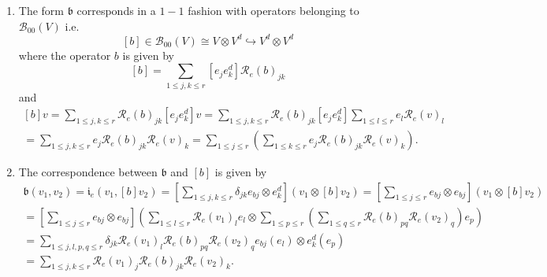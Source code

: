 \documentclass[aps,preprint]{revtex4}%
\begin{document}
\begin{enumerate}
\begin{enumerate}
\item The form $\mathfrak{b}$ corresponds in a $1-1$ fashion with operators
belonging to $\mathcal{B}_{00}\left(  V\right)  $ i.e.
\begin{equation}
\left[  b\right]  \in\mathcal{B}_{00}\left(  V\right)  \cong V\otimes
V^{d}\hookrightarrow V^{d}\otimes V^{d}%
\end{equation}
where the operator $b$ is given by
\begin{equation}
\left[  b\right]  =\sum_{1\leq j,k\leq r}\left[  e_{j}e_{k}^{d}\right]
\mathcal{R}_{e}\left(  b\right)  _{jk}%
\end{equation}
and
\begin{gather}
\left[  b\right]  v=\sum_{1\leq j,k\leq r}\mathcal{R}_{e}\left(  b\right)
_{jk}\left[  e_{j}e_{k}^{d}\right]  v=\sum_{1\leq j,k\leq r}\mathcal{R}%
_{e}\left(  b\right)  _{jk}\left[  e_{j}e_{k}^{d}\right]  \sum_{1\leq l\leq
r}e_{l}\mathcal{R}_{e}\left(  v\right)  _{l}\\
=\sum_{1\leq j,k\leq r}e_{j}\mathcal{R}_{e}\left(  b\right)  _{jk}%
\mathcal{R}_{e}\left(  v\right)  _{k}=\sum_{1\leq j\leq r}\left(  \sum_{1\leq
k\leq r}e_{j}\mathcal{R}_{e}\left(  b\right)  _{jk}\mathcal{R}_{e}\left(
v\right)  _{k}\right)  .
\end{gather}


\item The correspondence between $\mathfrak{b}$ and $\left[  b\right]  $ is
given by
\begin{gather}
\mathfrak{b}\left(  v_{1},v_{2}\right)  =\mathfrak{i}_{e}\left(  v_{1},\left[
b\right]  v_{2}\right)  =\left[  \sum_{1\leq j,k\leq r}\mathcal{\delta}%
_{jk}e_{bj}\otimes e_{k}^{d}\right]  \left(  v_{1}\otimes\left[  b\right]
v_{2}\right)  =\left[  \sum_{1\leq j\leq r}e_{bj}\otimes e_{bj}\right]
\left(  v_{1}\otimes\left[  b\right]  v_{2}\right) \\
=\left[  \sum_{1\leq j\leq r}e_{bj}\otimes e_{bj}\right]  \left(  \sum_{1\leq
l\leq r}\mathcal{R}_{e}\left(  v_{1}\right)  _{l}e_{l}\otimes\sum_{1\leq p\leq
r}\left(  \sum_{1\leq q\leq r}\mathcal{R}_{e}\left(  b\right)  _{pq}%
\mathcal{R}_{e}\left(  v_{2}\right)  _{q}\right)  e_{p}\right) \\
=\sum_{1\leq j,l,p,q\leq r}\mathcal{\delta}_{jk}\mathcal{R}_{e}\left(
v_{1}\right)  _{l}\mathcal{R}_{e}\left(  b\right)  _{pq}\mathcal{R}_{e}\left(
v_{2}\right)  _{q}e_{bj}\left(  e_{l}\right)  \otimes e_{k}^{d}\left(
e_{p}\right) \\
=\sum_{1\leq j,k\leq r}\mathcal{R}_{e}\left(  v_{1}\right)  _{j}%
\mathcal{R}_{e}\left(  b\right)  _{jk}\mathcal{R}_{e}\left(  v_{2}\right)
_{k}.
\end{gather}



\end{enumerate}
\end{enumerate}
\end{document}
